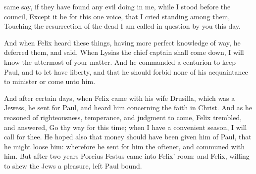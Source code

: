 {same
{}
say,
if they have
found
any evil
doing
in
me, while
I
stood
before the
council,
Except it be
for
this
one
voice,
that I
cried
standing
among
them,
Touching the
resurrection of the
dead
I am called in
question
by
you this
day.
\par }{\PP {}And when
Felix
heard these
things,
having more
perfect
knowledge
of
{}
way, he
deferred
them, and
said,
When
Lysias the chief
captain shall come
down, I will know the
uttermost of
your
matter.
And he
commanded a
centurion to
keep
Paul,
and to
let
{}
have
liberty,
and that he should
forbid
none of
his
acquaintance to
minister
or come
unto
him.
\par }{\PP {}And
after
certain
days,
when
Felix
came
with
his
wife
Drusilla,
which was a
Jewess, he sent
for
Paul,
and
heard
him
concerning the
faith
in
Christ.
And
as
he
reasoned
of
righteousness,
temperance,
and
judgment
to
come,
Felix
trembled, and
answered, Go thy
way for this
time;
when I
have a convenient
season, I will
call for
thee.
He
hoped
also
that
money should have been
given
him
of
Paul,
that he might
loose
him:
wherefore he sent
for
him the
oftener, and
communed
with
him.
But
after two
years
Porcius
Festus
came
into
Felix’ room:
and
Felix,
willing to
shew the
Jews a
pleasure,
left
Paul
bound.

}
